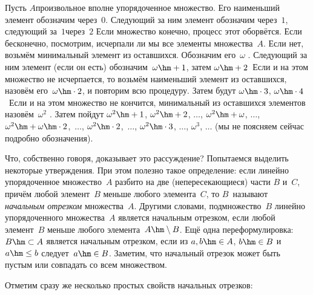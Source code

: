 Пусть $A$\т произвольное вполне упорядоченное множество. Его
наименьший элемент обозначим через~$0$. Следующий за ним элемент
обозначим через~$1$, следующий за~$1$\т через~$2$  Если
множество конечно, процесс этот оборвётся. Если бесконечно,
посмотрим, исчерпали ли мы все элементы множества~$A$. Если нет,
возьмём минимальный элемент из оставшихся. Обозначим его~$\omega$%
\index{$\omega$}.
Следующий за ним элемент (если он есть) обозначим~$\omega\hm+1$,
затем $\omega\hm+2$~ Если и на этом множество не
исчерпается, то возьмём наименьший элемент из оставшихся,
назовём его~$\omega\hm\cdot2$,
и повторим всю процедуру. Затем
будут $\omega\hm\cdot3$, $\omega\hm\cdot4$~ Если и на этом множество не
кончится, минимальный из оставшихся элементов назовём~$\omega^2$%
. Затем
пойдут $\omega^2\hm+1$, $\omega^2\hm+2$, $\dots$, $\omega^2\hm+\omega$,
$\dots$, $\omega^2\hm+\omega\hm\cdot2$,~$\dots$,
$\omega^2\hm\cdot2$,~$\dots$, $\omega^2\hm\cdot3$, $\dots$, $\omega^3$,
$\dots$ (мы не поясняем сейчас подробно обозначения).

Что, собственно говоря, доказывает это рассуждение? Попытаемся
выделить некоторые утверждения. При
этом полезно
такое определение: если линейно упорядоченное множество~$A$
разбито на две (непересекающиеся) части $B$ и~$C$, причём любой
элемент~$B$ меньше любого элемента~$C$, то $B$~называют
\emph{начальным отрезком} множества~$A$.
Другими словами,
подмножество~$B$ линейно упорядоченного множества~$A$ является
начальным отрезком, если любой элемент~$B$ меньше любого
элемента~$A\hm\setminus B$. Ещё одна переформулировка: $B\hm\subset A$
является начальным отрезком, если из $a,b\hm\in A$, \;$b\hm\in B$
и~$a\hm\le b$ следует~$a\hm\in B$. Заметим, что начальный отрезок
может быть пустым или совпадать со всем множеством.

Отметим сразу же несколько простых свойств начальных
отрезков:

